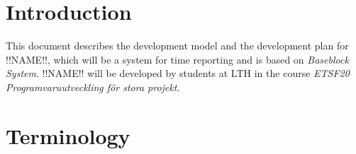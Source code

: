 \documentclass{article}
\date {#1}
\title {
    \documentNumber {01}    %
    \documentVersion {0.1}
    \documentTitle {Software development plan - SDP}
    \documentGroup {2}
    \documentResponsible {(PG) Project Management Group}
    \documentAuthors {(PG) Project Management Group}
    \documentDate {2021-01-29}
}
\begin{document}
\maketitle
\thispagestyle{empty}

\newpage

\tableofcontents

\newpage

\section{Introduction}
    This document describes the development model and the development plan for !!NAME!!, 
    which will be a system for time reporting and is based on \textit{Baseblock System}.
    !!NAME!! will be developed by students at LTH in the course 
    \textit{ETSF20 Programvaruutveckling för stora projekt}.

\section{Terminology}
    \renewcommand{\arraystretch}{1.7}  %
    
\end{document}
